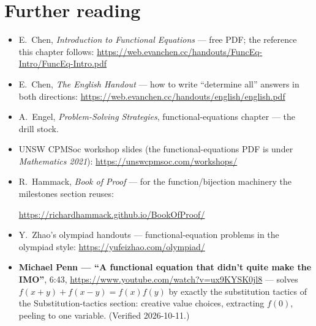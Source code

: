 \section*{Further reading}
\begin{itemize}
\item E.~Chen, \emph{Introduction to Functional Equations} --- free
PDF; the reference this chapter follows:
\url{https://web.evanchen.cc/handouts/FuncEq-Intro/FuncEq-Intro.pdf}
\item E.~Chen, \emph{The English Handout} --- how to write
``determine all'' answers in both directions:
\url{https://web.evanchen.cc/handouts/english/english.pdf}
\item A.~Engel, \emph{Problem-Solving Strategies}, functional-equations
chapter --- the drill stock.
\item UNSW CPMSoc workshop slides (the functional-equations PDF is
under \emph{Mathematics 2021}):
\url{https://unswcpmsoc.com/workshops/}
\item R.~Hammack, \emph{Book of Proof} --- for the
function/bijection machinery the milestones section reuses:

\url{https://richardhammack.github.io/BookOfProof/}
\item Y.~Zhao's olympiad handouts --- functional-equation problems in
the olympiad style:
\url{https://yufeizhao.com/olympiad/}
\end{itemize}

\begin{rulebox}
\begin{itemize}
\item \textbf{Michael Penn --- ``A functional equation that didn't
quite make the IMO''}, 6:43,
\url{https://www.youtube.com/watch?v=ux9KYSK0jl8}
--- solves
$f(x+y)+f(x-y)=f(x)f(y)$ by exactly the substitution tactics of
the Substitution-tactics section: creative value choices, extracting
$f(0)$, peeling to one variable. (Verified 2026-10-11.)
\end{itemize}
\end{rulebox}

\chapternotes
